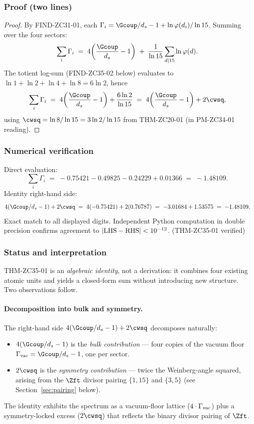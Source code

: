 \documentclass[12pt, a4paper]{article}
\begin{document}
\subsubsection{Proof (two lines)}

\begin{proof}
By FIND-ZC31-01, each $\Gamma_i = \Gcoup/d_s - 1 + \ln\varphi(d_i)/\ln 15$.
Summing over the four sectors:
\[
  \sum_{i} \Gamma_i
  \;=\; 4\!\left(\frac{\Gcoup}{d_s} - 1\right)
  \;+\; \frac{1}{\ln 15}\sum_{d \mid 15} \ln \varphi(d).
\]
The totient log-sum (FIND-ZC35-02 below) evaluates to
$\ln 1 + \ln 2 + \ln 4 + \ln 8 = 6 \ln 2$, hence
\[
  \sum_{i} \Gamma_i
  \;=\; 4\!\left(\frac{\Gcoup}{d_s} - 1\right) + \frac{6 \ln 2}{\ln 15}
  \;=\; 4\!\left(\frac{\Gcoup}{d_s} - 1\right) + 2\cwsq,
\]
using $\cwsq = \ln 8/\ln 15 = 3 \ln 2/\ln 15$ from THM-ZC20-01 (in
PM-ZC34-01 reading).
\end{proof}

\subsubsection{Numerical verification}

\begin{derivedbox}[title={THM-ZC35-01: Numerical verification (T-canonical)}]
Direct evaluation:
\[
  \sum_{i} \Gamma_i
  \;=\; -0.75421 - 0.49825 - 0.24229 + 0.01366
  \;=\; -1.48109.
\]
Identity right-hand side:
\[
  4(\Gcoup/d_s - 1) + 2\cwsq
  \;=\; 4(-0.75421) + 2(0.76787)
  \;=\; -3.01684 + 1.53575
  \;=\; -1.48109.
\]
Exact match to all displayed digits. Independent Python computation in
double precision confirms agreement to $|{\rm LHS}-{\rm RHS}| < 10^{-12}$.
\hfill\textup{(THM-ZC35-01 verified)}
\end{derivedbox}

\subsubsection{Status and interpretation}

THM-ZC35-01 is an \emph{algebraic identity}, not a derivation: it
combines four existing atomic units and yields a closed-form sum without
introducing new structure. Two observations follow.

\paragraph{Decomposition into bulk and symmetry.}
The right-hand side $4(\Gcoup/d_s - 1) + 2\cwsq$ decomposes naturally:
\begin{itemize}
  \item $4(\Gcoup/d_s - 1)$ is the \emph{bulk contribution} --- four copies
        of the vacuum floor $\Gamma_{\rm vac} = \Gcoup/d_s - 1$, one per
        sector.
  \item $2\cwsq$ is the \emph{symmetry contribution} --- twice the
        Weinberg-angle squared, arising from the $\Zft$ divisor pairing
        $\{1,15\}$ and $\{3,5\}$ (see Section~\ref{sec:pairing} below).
\end{itemize}
The identity exhibits the spectrum as a vacuum-floor lattice
($4 \cdot \Gamma_{\rm vac}$) plus a symmetry-locked excess
($2\cwsq$) that reflects the binary divisor pairing of $\Zft$.
\end{document}
